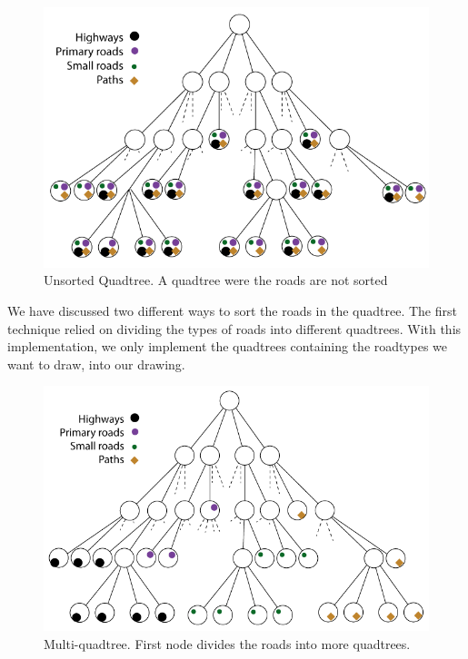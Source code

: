 \begin{figure}[h!]
\centering
\includegraphics[width=1\linewidth]{images/UnsortedQuadtree.png}
\caption{Unsorted Quadtree. A quadtree were the roads are not sorted}
\label{IMPL-USQ}
\end{figure}

We have discussed two different ways to sort the roads in the quadtree. The first technique 
relied on dividing the types of roads into different quadtrees. With this implementation, we 
only implement the quadtrees containing the roadtypes we want to draw, into our drawing.

\begin{figure}[h!]
\centering
\includegraphics[width=1\linewidth]{images/MultiQuadtree.png}
\caption{Multi-quadtree. First node divides the roads into more
quadtrees.}
\label{IMPL-DCQ}
\end{figure}

